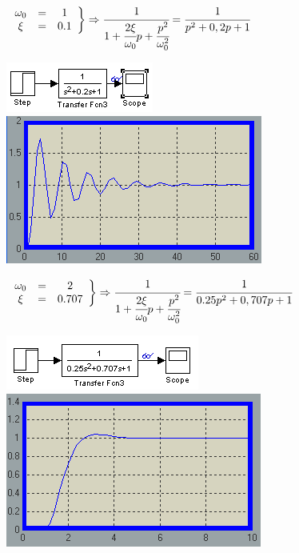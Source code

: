 \documentclass[10pt]{article}
\begin{document}
  \subsection{}
   $
    \left. \begin{array}{c c c}
     \omega_0 &=& 1 \\
     \xi &=& 0.1
    \end{array} 
    \right\} 
    \Rightarrow
    \cfrac{1}{1+\cfrac{2\xi}{\omega_0} p+\cfrac{p^2}{\omega_0^2}} = \cfrac{1}{p^2+0,2p+1}
   $
   \begin{center}
    \includegraphics{3a_1}
    \includegraphics{3a_1-s}
   \end{center}
   $
    \left. \begin{array}{c c c}
     \omega_0 &=& 2 \\
     \xi &=& 0.707
    \end{array} 
    \right\} 
    \Rightarrow
    \cfrac{1}{1+\cfrac{2\xi}{\omega_0} p+\cfrac{p^2}{\omega_0^2}} = \cfrac{1}{0.25p^2+0,707p+1}
   $
   \begin{center}
    \includegraphics{3a_2}
    \includegraphics{3a_2-s}
   \end{center}
\end{document}
